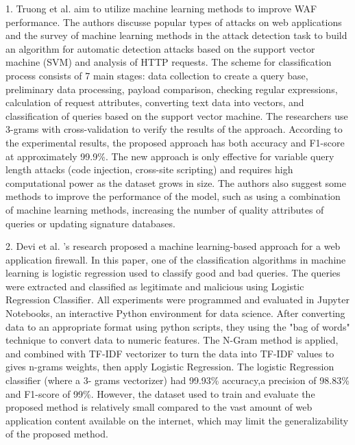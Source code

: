 1.	Truong et al. \cite{Truong} aim to utilize machine learning methods to improve WAF performance. The authors discusse popular types of attacks on web applications and the survey of machine learning methods in the attack detection task to build an algorithm for automatic detection attacks based on the support vector machine (SVM) and analysis of HTTP requests. The scheme for classification process consists of 7 main stages: data  collection  to create a query base, preliminary data processing, payload comparison, checking regular expressions, calculation of request attributes, converting text data into vectors, and classification of queries based on the support vector machine. The researchers use 3-grams with cross-validation to verify the results of the approach. According to the experimental results, the proposed approach has both accuracy and F1-score at approximately 99.9\%. The new approach is only effective for variable query length attacks (code injection, cross-site scripting) and requires high computational power as the dataset grows in size. The authors also suggest some methods to improve the performance of the model, such as using a combination of machine learning methods, increasing the number of quality attributes of queries or updating signature databases.

2.	Devi et al. \cite{Devi}'s research proposed a machine learning-based approach for a web application firewall. In this paper, one of the classification algorithms in machine learning is logistic regression used to classify good and bad queries. The queries were extracted and classified as legitimate and malicious using Logistic Regression Classifier. All experiments were programmed and evaluated in
Jupyter Notebooks, an interactive Python environment for data science. After converting data to an appropriate format using python scripts, they using the "bag of words" technique to convert data to numeric features. The N-Gram method is applied, and combined with TF-IDF vectorizer to turn the data into TF-IDF values to gives n-grams weights, then apply Logistic Regression. The logistic Regression classifier (where a 3- grams vectorizer) had 99.93\% accuracy,a precision of 98.83\% and F1-score of 99\%. However, the dataset used to train and evaluate the proposed method is relatively small compared to the vast amount of web application content available on the internet, which may limit the generalizability of the proposed method.

